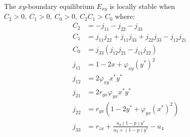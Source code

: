 \begin{theorem}\label{thm:boundary-xy-stability}
    The $xy$-boundary equilibrium $E_{xy}$ is locally stable when $C_2>0,\ C_1>0,\ C_0>0,\ C_2C_1>C_0$ where:
    \begin{align*}
        C_2 &= -j_{11}-j_{22}-j_{33}\\
        C_1 &= j_{11}j_{22}+j_{11}j_{33}+j_{22}j_{33}-j_{12}j_{21}\\
        C_0 &= j_{33}\left(j_{12}j_{21}-j_{11}j_{22}\right)\\
        j_{11} &= 1-2x+\varphi_{xy}\left(y^*\right)^2\\
        j_{12} &= 2\varphi_{xy}x^*y^*\\
        j_{21} &= 2r_{yx}\varphi_{yx}x^*y^*\\
        j_{22} &= r_{yx}\left(1-2y^*+\varphi_{yx}\left(x^*\right)^2\right)\\
        j_{33} &= r_{zx}+\frac{u_3\left(1-p\right)y^*}{u_2+\left(1-p\right)y^*}-u_4
    \end{align*}
\end{theorem}
